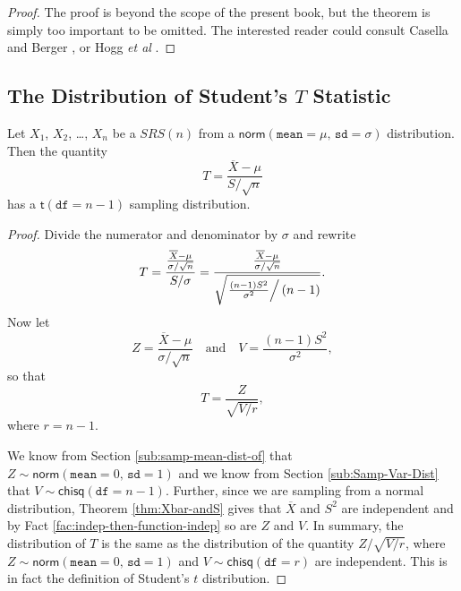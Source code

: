 \documentclass[captions=tableheading]{scrbook}
\begin{document}
\begin{proof}
The proof is beyond the scope of the present book, but the theorem is simply too important to be omitted. The interested reader could consult Casella and Berger \cite{Casella2002}, or Hogg \emph{et al} \cite{Hogg2005}. 
\end{proof}
\subsection{The Distribution of Student's \(T\) Statistic}
\label{sec-8-2-3}

\label{sub:Student's-t-Distribution}

\begin{prop}
Let \(X_{1}\), \(X_{2}\), \ldots{}, \(X_{n}\) be a \(SRS(n)\) from a \(\mathsf{norm}(\mathtt{mean}=\mu,\,\mathtt{sd}=\sigma)\) distribution. Then the quantity 
\begin{equation}
T=\frac{\overline{X}-\mu}{S/\sqrt{n}}
\end{equation}
has a \(\mathsf{t}(\mathtt{df}=n-1)\) sampling distribution.
\end{prop}

\begin{proof}
Divide the numerator and denominator by \(\sigma\) and rewrite
\[
T=\frac{\frac{\overline{X}-\mu}{\sigma/\sqrt{n}}}{S/\sigma}=\frac{\frac{\overline{X}-\mu}{\sigma/\sqrt{n}}}{\sqrt{\left.\frac{(n-1)S^{2}}{\sigma^{2}}\right\slash (n-1)}}.
\]
Now let 
\[
Z=\frac{\overline{X}-\mu}{\sigma/\sqrt{n}}\quad\mbox{and}\quad V=\frac{(n-1)S^{2}}{\sigma^{2}},
\]
so that
\begin{equation}
T=\frac{Z}{\sqrt{V/r}},
\end{equation}
where \(r=n-1\).

We know from Section \ref{sub:samp-mean-dist-of} that \(Z\sim\mathsf{norm}(\mathtt{mean}=0,\,\mathtt{sd}=1)\) and we know from Section \ref{sub:Samp-Var-Dist} that \(V\sim\mathsf{chisq}(\mathtt{df}=n-1)\). Further, since we are sampling from a normal distribution, Theorem \ref{thm:Xbar-andS} gives that \(\overline{X}\) and \(S^{2}\) are independent and by Fact \ref{fac:indep-then-function-indep} so are \(Z\) and \(V\). In summary, the distribution of \(T\) is the same as the distribution of the quantity \(Z/\sqrt{V/r}\), where \(Z\sim\mathsf{norm}(\mathtt{mean}=0,\,\mathtt{sd}=1)\) and \(V\sim\mathsf{chisq}(\mathtt{df}=r)\) are independent. This is in fact the definition of Student's \(t\) distribution.
\end{proof}
\end{document}
